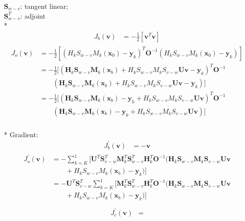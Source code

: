 \documentclass[a4paper,12pt,titlepage]{article}
\begin{document}
$\mathbf{S}_{w-v}$: tangent linear; \\
$\mathbf{S}^T_{w-v}$: adjoint
\\*
\begin{align}
J_b(\mathbf{v})&=-\frac{1}{2}[\mathbf{v}^T\mathbf{v}]
\end{align}
\begin{align}
\begin{split}
J_o(\mathbf{v})& =-\frac{1}{2}[(H_kS_{w-v}M_k(\mathbf{x}_0)-\mathbf{y}_k)^T\mathbf{O}^{-1}(H_kS_{w-v}M_k(\mathbf{x}_0)-\mathbf{y}_k)]  \\
& =-\frac{1}{2}[(\mathbf{H}_k\mathbf{S}_{w-v}\mathbf{M}_k(\mathbf{x}_b)+H_kS_{w-v}M_kS_{v-w}\mathbf{Uv}-\mathbf{y}_k)^T\mathbf{O}^{-1}  \\
&  \qquad (\mathbf{H}_k\mathbf{S}_{w-v}\mathbf{M}_k(\mathbf{x}_b)+H_kS_{w-v}M_kS_{v-w}\mathbf{Uv}-\mathbf{y}_k)]  \\
& =-\frac{1}{2}[(\mathbf{H}_k\mathbf{S}_{w-v}\mathbf{M}_k(\mathbf{x}_b)-\mathbf{y}_k+H_kS_{w-v}M_kS_{v-w}\mathbf{Uv})^T\mathbf{O}^{-1}  \\
&  \qquad (\mathbf{H}_k\mathbf{S}_{w-v}\mathbf{M}_k(\mathbf{x}_b)-\mathbf{y}_k+H_kS_{w-v}M_kS_{v-w}\mathbf{Uv})]
\end{split}
\end{align}
\\*
Gradient:
\begin{align}
J^{'}_b(\mathbf{v}) & =-\mathbf{v}
\end{align}
\begin{align}
\begin{split}
J^{'}_o(\mathbf{v}) & =-\sum_{k=K}^1[\mathbf{U}^T\mathbf{S}^T_{v-w}\mathbf{M}^T_k\mathbf{S}^T_{w-v}\mathbf{H}^T_k\mathbf{O}^{-1}(\mathbf{H}_k\mathbf{S}_{w-v}\mathbf{M}_k\mathbf{S}_{v-w}\mathbf{Uv}\\
& \qquad +H_kS_{w-v}M_k(\mathbf{x}_b)-\mathbf{y}_k)]\\
& =-\mathbf{U}^T\mathbf{S}^T_{v-w}\sum_{k=K}^1[\mathbf{M}^T_k\mathbf{S}^T_{w-v}\mathbf{H}^T_k\mathbf{O}^{-1}(\mathbf{H}_k\mathbf{S}_{w-v}\mathbf{M}_k\mathbf{S}_{v-w}\mathbf{Uv}\\
& \qquad +H_kS_{w-v}M_k(\mathbf{x}_b)-\mathbf{y}_k)]\\
\end{split}
\end{align}
\begin{align}
J^{'}_c(\mathbf{v})&=
\end{align}
\end{document}
